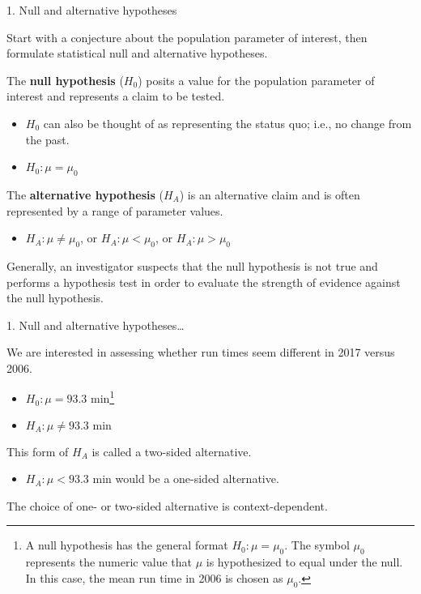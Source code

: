 \documentclass[
  ignorenonframetext,
  aspectratio=169]{beamer}
\providecommand{\tightlist}{%
  \setlength{\itemsep}{0pt}\setlength{\parskip}{0pt}}
\begin{document}
\begin{frame}{1. Null and alternative hypotheses}
\protect\hypertarget{null-and-alternative-hypotheses}{}
\small

Start with a conjecture about the population parameter of interest, then
formulate statistical null and alternative hypotheses.

The \textbf{null hypothesis} (\(H_0\)) posits a value for the population
parameter of interest and represents a claim to be tested.

\begin{itemize}
\item
  \(H_0\) can also be thought of as representing the status quo; i.e.,
  no change from the past.
\item
  \(H_0: \mu = \mu_0\)
\end{itemize}

The \textbf{alternative hypothesis} (\(H_A\)) is an alternative claim
and is often represented by a range of parameter values.

\begin{itemize}
\tightlist
\item
  \(H_A: \mu \neq \mu_0\), or \(H_A: \mu < \mu_0\), or
  \(H_A: \mu > \mu_0\)
\end{itemize}

Generally, an investigator suspects that the null hypothesis is not true
and performs a hypothesis test in order to evaluate the strength of
evidence against the null hypothesis.
\end{frame}

\begin{frame}{1. Null and alternative hypotheses\ldots{}}
\protect\hypertarget{null-and-alternative-hypotheses-1}{}
\small

We are interested in assessing whether run times seem different in 2017
versus 2006.

\begin{itemize}
\item
  \(H_0: \mu = 93.3 \text{ min}\)\footnote{A null hypothesis has the general format $H_0: \mu = \mu_0$. The symbol $\mu_0$ represents the numeric value that $\mu$ is hypothesized to equal under the null. In this case, the mean run time in 2006 is chosen as $\mu_0$.}
\item
  \(H_A: \mu \neq 93.3 \text{ min}\)
\end{itemize}

This form of \(H_A\) is called a two-sided alternative.

\begin{itemize}
\tightlist
\item
  \(H_A: \mu < 93.3 \text{ min}\) would be a one-sided alternative.
\end{itemize}

The choice of one- or two-sided alternative is context-dependent.
\end{frame}
\end{document}
